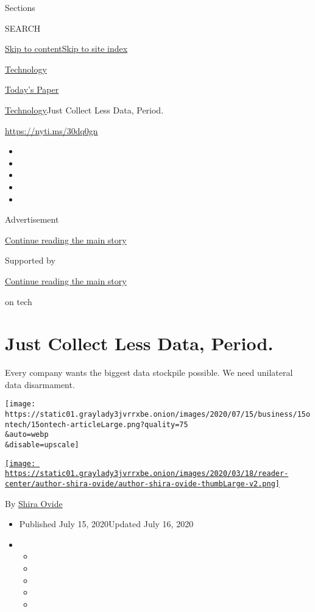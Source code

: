 Sections

SEARCH

\protect\hyperlink{site-content}{Skip to
content}\protect\hyperlink{site-index}{Skip to site index}

\href{https://www.nytimes3xbfgragh.onion/section/technology}{Technology}

\href{https://myaccount.nytimes3xbfgragh.onion/auth/login?response_type=cookie\&client_id=vi}{}

\href{https://www.nytimes3xbfgragh.onion/section/todayspaper}{Today's
Paper}

\href{/section/technology}{Technology}\textbar{}Just Collect Less Data,
Period.

\href{https://nyti.ms/30dq0gn}{https://nyti.ms/30dq0gn}

\begin{itemize}
\item
\item
\item
\item
\item
\end{itemize}

Advertisement

\protect\hyperlink{after-top}{Continue reading the main story}

Supported by

\protect\hyperlink{after-sponsor}{Continue reading the main story}

on tech

\hypertarget{just-collect-less-data-period}{%
\section{Just Collect Less Data,
Period.}\label{just-collect-less-data-period}}

Every company wants the biggest data stockpile possible. We need
unilateral data disarmament.

\texttt{[image: https://static01.graylady3jvrrxbe.onion/images/2020/07/15/business/15ontech/15ontech-articleLarge.png?quality=75\\\&auto=webp\\\&disable=upscale]}

\href{https://www.nytimes3xbfgragh.onion/by/shira-ovide}{\texttt{[image: https://static01.graylady3jvrrxbe.onion/images/2020/03/18/reader-center/author-shira-ovide/author-shira-ovide-thumbLarge-v2.png]}}

By \href{https://www.nytimes3xbfgragh.onion/by/shira-ovide}{Shira Ovide}

\begin{itemize}
\item
  Published July 15, 2020Updated July 16, 2020
\item
  \begin{itemize}
  \item
  \item
  \item
  \item
  \item
  \end{itemize}
\end{itemize}

